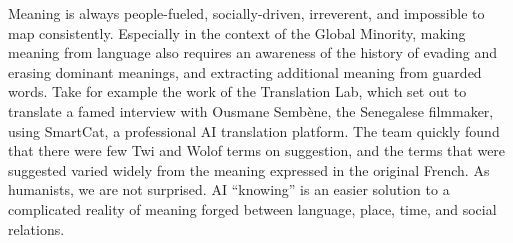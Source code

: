 Meaning is always people-fueled, socially-driven, irreverent, and impossible to map consistently. Especially in the context of the Global Minority, making meaning from language also requires an awareness of the history of evading and erasing dominant meanings, and extracting additional meaning from guarded words. Take for example the work of the Translation Lab, which set out to translate a famed interview with Ousmane Sembène, the Senegalese filmmaker, using SmartCat, a professional AI translation platform. The team quickly found that there were few Twi and Wolof terms on suggestion, and the terms that were suggested varied widely from the meaning expressed in the original French. As humanists, we are not surprised. AI ``knowing'' is an easier solution to a complicated reality of meaning forged between language, place, time, and social relations. 